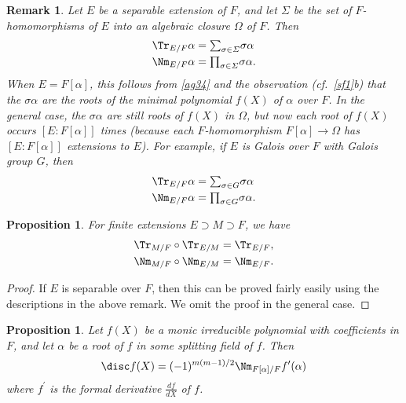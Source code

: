 \documentclass[a4paper,11pt,final,openany]{memoir}
\newtheorem{proposition}[X]{Proposition}
\newtheorem{remark}[X]{Remark}
\theoremstyle{nonumberplain}
\newtheorem{proof}{Proof.}
\begin{document}
\begin{remark}
\label{ag36}Let $E$ be a separable extension of $F$, and let $\varSigma$ be
the set of $F$-homomorphisms of $E$ into an algebraic closure $\Omega$ of $F$.
Then
\begin{align*}
\Tr_{E/F}\alpha &  =%
{\textstyle\sum\nolimits_{\sigma\in\varSigma}}
\sigma\alpha\\
\Nm_{E/F}\alpha &  =%
{\textstyle\prod\nolimits_{\sigma\in\varSigma}}
\sigma\alpha.
\end{align*}
When $E=F[\alpha]$, this follows from \ref{ag34} and the observation
(cf.\ \ref{sf1}b) that the $\sigma\alpha$ are the roots of the minimal
polynomial $f(X)$ of $\alpha$ over $F$. In the general case, the $\sigma
\alpha$ are still roots of $f(X)$ in $\Omega$, but now each root of $f(X)$
occurs $[E\colon F[\alpha]]$ times (because each $F$-homomorphism
$F[\alpha]\rightarrow\Omega$ has $[E\colon F[\alpha]]$ extensions to $E$). For
example, if $E$ is Galois over $F$ with Galois group $G$, then
\begin{align*}
\Tr_{E/F}\alpha &  =%
{\textstyle\sum\nolimits_{\sigma\in G}}
\sigma\alpha\\
\Nm_{E/F}\alpha &  =%
{\textstyle\prod\nolimits_{\sigma\in G}}
\sigma\alpha.
\end{align*}

\end{remark}

\begin{proposition}
\label{ag37}For finite extensions $E\supset M\supset F$, we have
\begin{align*}
\Tr_{M/F}\circ\Tr_{E/M}  &  =\Tr_{E/F},\\
\Nm_{M/F}\circ\Nm_{E/M}  &  =\Nm_{E/F}.
\end{align*}

\end{proposition}

\begin{proof}
If $E$ is separable over $F$, then this can be proved fairly easily using the
descriptions in the above remark. We omit the proof in the general case.
\end{proof}

\begin{proposition}
\label{ag38}Let $f(X)$ be a monic irreducible polynomial with coefficients in
$F$, and let $\alpha$ be a root of $f$ in some splitting field of $f$. Then
\[
\disc f(X)=(-1)^{m(m-1)/2}\Nm_{F[\alpha]/F}f^{\prime}(\alpha)
\]
where $f^{\prime}$ is the formal derivative $\frac{df}{dX}$ of $f$.
\end{proposition}
\end{document}
